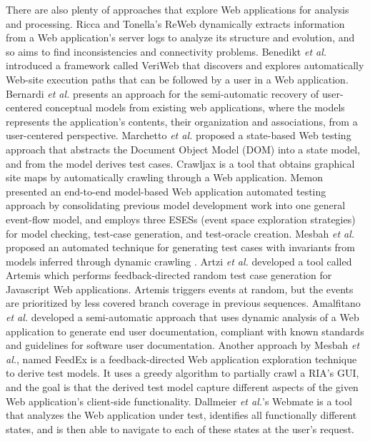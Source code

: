 \documentclass[conference]{IEEEtran}
\begin{document}
There are also plenty of approaches that explore Web applications for analysis and processing. Ricca and Tonella's ReWeb \cite{ricca2001understanding} dynamically extracts information from a Web application's server logs to analyze its structure and evolution, and so aims to find inconsistencies and connectivity problems. Benedikt \textit{et al.} introduced a framework called VeriWeb \cite{benedikt2002veriWeb} that discovers and explores automatically Web-site execution paths that can be followed by a user in a Web application. Bernardi \textit{et al.} \cite{bernardi2008reverse} presents an approach for the semi-automatic recovery of user-centered conceptual models from existing web applications, where the models represents the application's contents, their organization and associations, from a user-centered perspective. Marchetto \textit{et al.} proposed a state-based Web testing approach \cite{marchetto2008state} that abstracts the Document Object Model (DOM) into a state model, and from the model derives test cases. Crawljax \cite{roest2010automated} is a tool that obtains graphical site maps by automatically crawling through a Web application. Memon presented an end-to-end model-based Web application automated testing approach \cite{memon2007event} by consolidating previous model development work into one general event-flow model, and employs three ESESs (event space exploration strategies) for model checking, test-case generation, and test-oracle creation. Mesbah \textit{et al.} proposed an automated technique for generating test cases with invariants from models inferred through dynamic crawling \cite{mesbah2012invariant}. Artzi \textit{et al.} developed a tool called Artemis \cite{artzi2011framework} which performs feedback-directed random test case generation for Javascript Web applications. Artemis triggers events at random, but the events are prioritized by less covered branch coverage in previous sequences. Amalfitano \textit{et al.} developed a semi-automatic approach \cite{amalfitano2011using} that uses dynamic analysis of a Web application to generate end user documentation, compliant with known standards and guidelines for software user documentation. Another approach by Mesbah \textit{et al.}, named FeedEx \cite{fard2013feedback} is a feedback-directed Web application exploration technique to derive test models. It uses a greedy algorithm to partially crawl a RIA's GUI, and the goal is that the derived test model capture different aspects of the given Web application's client-side functionality.  Dallmeier \textit{et al.}'s Webmate \cite{dallmeier2012Webmate,dallmeier2013Webmate} is a tool that analyzes the Web application under test, identifies all functionally different states, and is then able to navigate to each of these states at the user’s request.
\end{document}
